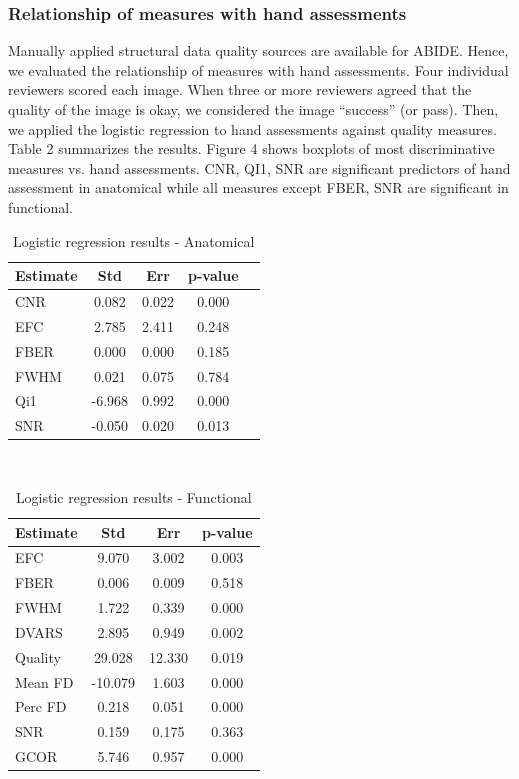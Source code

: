 \documentclass{frontiersSCNS} %
\begin{document}
\subsubsection{Relationship of measures with hand assessments}
\label{sec:27}
Manually applied structural data quality sources are available for ABIDE. Hence, we evaluated the relationship of measures with hand assessments. Four individual reviewers scored each image. When three or more reviewers agreed that the quality of the image is okay, we considered the image “success” (or pass). Then, we applied the logistic regression to hand assessments against quality measures. Table 2 summarizes the results. Figure 4 shows boxplots of most discriminative measures vs. hand assessments. CNR, QI1, SNR are significant predictors of hand assessment in anatomical while all measures except FBER, SNR are significant in functional.
\begin{table}
  \begin{center}
    \begin{tabular}{ | l | c | c | c | p{1.2cm} |}
    \hline
    Estimate & Std & Err & p-value  \\ \hline
    CNR & 0.082 & 0.022 & 0.000 \\
    EFC & 2.785 & 2.411 & 0.248 \\
    FBER & 0.000 & 0.000 & 0.185 \\
    FWHM & 0.021 & 0.075 & 0.784 \\
    Qi1 & -6.968 & 0.992 & 0.000 \\
    SNR & -0.050 & 0.020 & 0.013 \\ 
    \hline
    \end{tabular}
    \caption{Logistic regression results - Anatomical}
  \end{center}
\end{table}
\\
\begin{table}
  \begin{center}
    \begin{tabular}{ | l | c | c | c | }
    \hline
    Estimate & Std & Err & p-value  \\ \hline
    EFC & 9.070 & 3.002 & 0.003 \\
    FBER & 0.006 & 0.009 & 0.518 \\
    FWHM & 1.722 & 0.339 & 0.000 \\
    DVARS & 2.895 & 0.949 & 0.002 \\
    Quality & 29.028 & 12.330 & 0.019 \\
    Mean FD & -10.079 & 1.603 & 0.000 \\
    Perc FD & 0.218 & 0.051 & 0.000 \\
    SNR & 0.159 & 0.175 & 0.363 \\
    GCOR & 5.746 & 0.957 & 0.000 \\ 
    \hline
    \end{tabular}
    \caption{Logistic regression results - Functional}
  \end{center}
\end{table}
\end{document}
